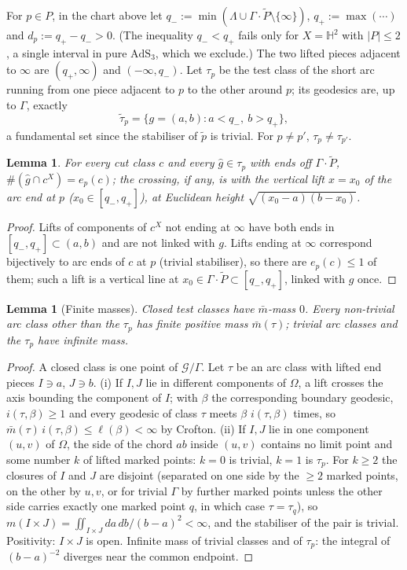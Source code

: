 \documentclass[aps,prd,onecolumn,superscriptaddress,nofootinbib,amsmath,amssymb,11pt]{revtex4-2}
\newtheorem{lemma}[theorem]{Lemma}
\theoremstyle{definition}
\newcommand{\AdS}{\mathrm{AdS}_3}
\newcommand{\Hyp}{\mathbb{H}^2}
\newcommand{\Gq}{\mathcal{G}/\Gamma}
\newcommand{\mbar}{\bar m}
\newcommand{\Pt}{\tilde P}
\begin{document}
For $p\in P$, in the chart above let
$q_-:=\min(\Lambda\cup\Gamma\cdot\Pt\setminus\{\infty\})$, $q_+:=\max(\cdots)$ and $d_p:=q_+-q_->0$. (The inequality
$q_-<q_+$ fails only for $X=\Hyp$ with $|P|\le2$, a single interval in pure $\AdS$, which we exclude.) The two lifted
pieces adjacent to $\infty$ are $(q_+,\infty)$ and $(-\infty,q_-)$. Let $\tau_p$ be the test class of the short arc
running from one piece adjacent to $p$ to the other around $p$; its geodesics are, up to $\Gamma$, exactly
\[
\tilde\tau_p=\{g=(a,b):a<q_-,\ b>q_+\},
\]
a fundamental set since the stabiliser of $\tilde p$ is trivial. For $p\ne p'$, $\tau_p\ne\tau_{p'}$.

\begin{lemma}\label{lem:taup}
For every cut class $c$ and every $\hat g\in\tau_p$ with ends off $\Gamma\cdot\Pt$, $\#(\hat g\cap c^X)=e_p(c)$; the
crossing, if any, is with the vertical lift $x=x_0$ of the arc end at $p$ ($x_0\in[q_-,q_+]$), at Euclidean height
$\sqrt{(x_0-a)(b-x_0)}$.
\end{lemma}

\begin{proof}
Lifts of components of $c^X$ not ending at $\infty$ have both ends in $[q_-,q_+]\subset(a,b)$ and are not linked with
$g$. Lifts ending at $\infty$ correspond bijectively to arc ends of $c$ at $p$ (trivial stabiliser), so there are
$e_p(c)\le1$ of them; such a lift is a vertical line at $x_0\in\Gamma\cdot\Pt\subset[q_-,q_+]$, linked with $g$ once.
\end{proof}

\begin{lemma}[Finite masses]\label{lem:mass}
Closed test classes have $\mbar$-mass $0$. Every non-trivial arc class other than the $\tau_p$ has finite positive
mass $\mbar(\tau)$; trivial arc classes and the $\tau_p$ have infinite mass.
\end{lemma}

\begin{proof}
A closed class is one point of $\Gq$. Let $\tau$ be an arc class with lifted end pieces $I\ni a$, $J\ni b$.
(i) If $I,J$ lie in different components of $\Omega$, a lift crosses the axis bounding the component of $I$; with
$\beta$ the corresponding boundary geodesic, $i(\tau,\beta)\ge1$ and every geodesic of class $\tau$ meets $\beta$
$i(\tau,\beta)$ times, so $\mbar(\tau)\,i(\tau,\beta)\le\ell(\beta)<\infty$ by Crofton. (ii) If $I,J$ lie in one
component $(u,v)$ of $\Omega$, the side of the chord $ab$ inside $(u,v)$ contains no limit point and some number $k$
of lifted marked points: $k=0$ is trivial, $k=1$ is $\tau_p$. For $k\ge2$ the closures of $I$ and $J$ are disjoint
(separated on one side by the $\ge2$ marked points, on the other by $u,v$, or for trivial $\Gamma$ by further marked
points unless the other side carries exactly one marked point $q$, in which case $\tau=\tau_q$), so
$m(I\times J)=\iint_{I\times J}da\,db/(b-a)^2<\infty$, and the stabiliser of the pair is trivial. Positivity: $I\times
J$ is open. Infinite mass of trivial classes and of $\tau_p$: the integral of $(b-a)^{-2}$ diverges near the common
endpoint.
\end{proof}
\end{document}

